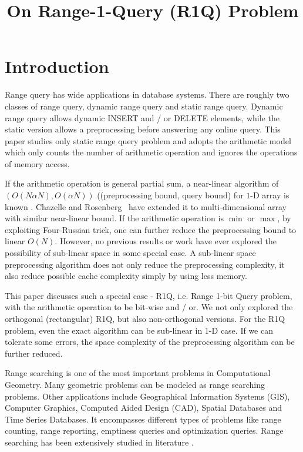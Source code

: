 \documentclass{article}
\title{On Range-1-Query (R1Q) Problem}
\date{}
\begin{document}
\maketitle
\section{Introduction}
Range query has wide applications in database systems. There are
roughly two classes of range query, dynamic range query and static range
query. Dynamic range query allows dynamic INSERT and / or DELETE elements,
while the static version allows a preprocessing before answering any
online query.  This paper studies only static range query problem and
adopts the arithmetic model which only counts the number of arithmetic
operation and ignores the operations of memory access.

If the arithmetic operation is general partial sum, a near-linear algorithm of $(O(N \alpha N), O(\alpha N))$ ((preprocessing bound, query bound) for $1$-D array is known \cite{yao}. Chazelle and Rosenberg~\cite{chazelle} have extended it to multi-dimensional array with similar near-linear bound. If the arithmetic operation is
$\min$ or $\max$, by exploiting Four-Russian trick, one can further reduce the preprocessing bound to linear $O(N)$. However, no previous results or work have ever explored the possibility of sub-linear space in some special case.  A sub-linear space preprocessing algorithm does not only reduce the preprocessing complexity, it also reduce possible cache complexity simply by using less memory.

This paper discusses such a special case - {R1Q}, i.e. Range 1-bit Query problem, with the arithmetic operation to be bit-wise and / or. We not only explored the orthogonal (rectangular) {R1Q}, but also non-orthogonal versions.  For the {R1Q} problem, even the exact algorithm can be sub-linear in $1$-D case. If we can tolerate some errors, the
space complexity of the preprocessing algorithm can be further reduced.

Range searching is one of the most important problems in Computational Geometry. Many geometric problems can be modeled as range searching problems. Other applications include Geographical Information Systems (GIS), Computer Graphics, Computed Aided Design (CAD), Spatial Databases and Time Series Databases. It encompasses different types of problems like range counting, range reporting, emptiness queries and optimization queries. Range searching has been extensively studied in literature \cite{sharir, agarwal, ishaque}.
\end{document}
